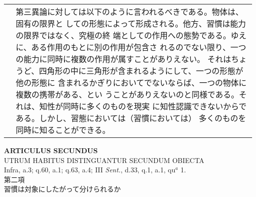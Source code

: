 \documentclass[10pt]{jsarticle} %
\begin{document}
\begin{longtable}{p{21em}p{21em}}
&


第三異論に対しては以下のように言われるべきである。物体は、固有の限界と
しての形態によって形成される。他方、習慣は能力の限界ではなく、究極の終
端としての作用への態勢である。ゆえに、ある作用のもとに別の作用が包含さ
れるのでない限り、一つの能力に同時に複数の作用が属すことがありえない。
それはちょうど、四角形の中に三角形が含まれるようにして、一つの形態が他の形態に
含まれるかぎりにおいてでないならば、一つの物体に複数の携帯がある、とい
うことがありえないのと同様である。それは、知性が同時に多くのものを現実
に知性認識できないからである。しかし、習態においては（習慣においては）
多くのものを同時に知ることができる。


\end{longtable}
\newpage


\begin{center}
{\Large {\bf ARTICULUS SECUNDUS}}\\
{\large UTRUM HABITUS DISTINGUANTUR SECUNDUM OBIECTA}\\
{\footnotesize Infra, a.3; q.60, a.1; q.63, a.4; III {\itshape Sent.}, d.33, q.1, a.1, qu$^{a}$ 1.}\\
{\Large 第二項\\習慣は対象にしたがって分けられるか}
\end{center}
\end{document}
